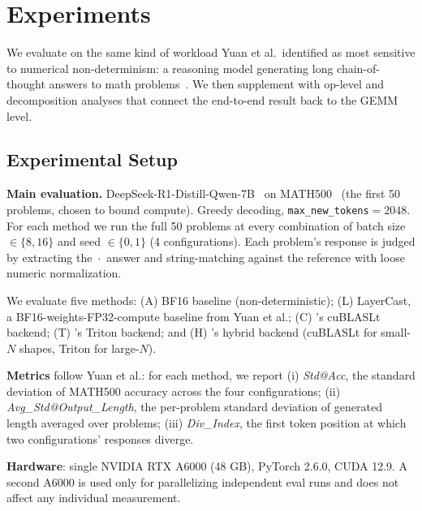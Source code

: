
\section{Experiments}
\label{sec:experiments}

We evaluate \dllm on the same kind of workload Yuan et al.\ identified as most
sensitive to numerical non-determinism: a reasoning model generating long
chain-of-thought answers to math problems~\citep{yuan2025numerical}. We then
supplement with op-level and decomposition analyses that connect the
end-to-end result back to the GEMM level.

\subsection{Experimental Setup}

\textbf{Main evaluation.} DeepSeek-R1-Distill-Qwen-7B~\citep{deepseekr1} on
MATH500~\citep{hendrycks2021math} (the first 50 problems, chosen to bound
compute). Greedy decoding, \texttt{max\_new\_tokens}$=2048$. For each method
we run the full 50 problems at every combination of batch size
$\in\{8,16\}$ and seed $\in\{0,1\}$ (4 configurations). Each problem's
response is judged by extracting the $\boxed{\cdot}$ answer and string-matching
against the reference with loose numeric normalization.

We evaluate five methods: (A) BF16 baseline (non-deterministic); (L) LayerCast,
a BF16-weights-FP32-compute baseline from Yuan et al.; (C) \dllm's cuBLASLt
backend; (T) \dllm's Triton backend; and (H) \dllm's hybrid backend (cuBLASLt
for small-$N$ shapes, Triton for large-$N$).

\textbf{Metrics} follow Yuan et al.: for each method, we report (i)
\emph{Std@Acc}, the standard deviation of MATH500 accuracy across the four
configurations; (ii) \emph{Avg\_Std@Output\_Length}, the per-problem standard
deviation of generated length averaged over problems; (iii) \emph{Div\_Index},
the first token position at which two configurations' responses diverge.

\textbf{Hardware}: single NVIDIA RTX A6000 (48 GB), PyTorch 2.6.0, CUDA 12.9.
A second A6000 is used only for parallelizing independent eval runs and does
not affect any individual measurement.

